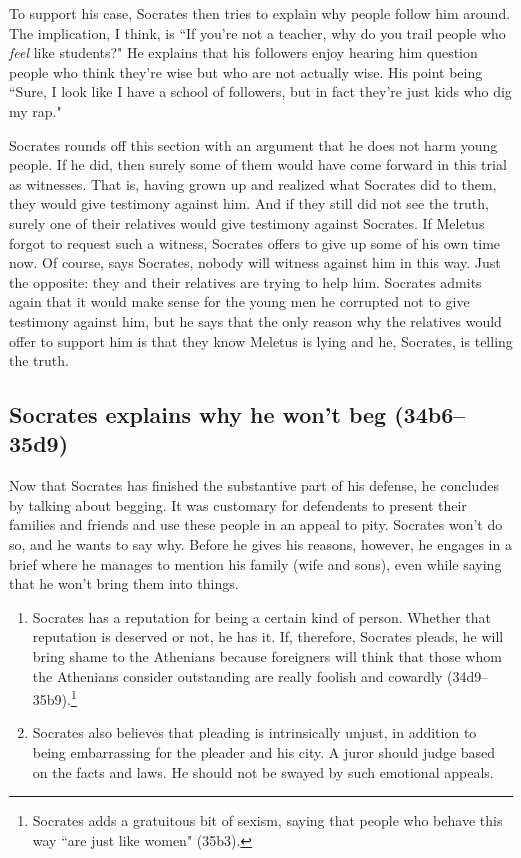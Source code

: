 \documentclass[11pt]{article}
\begin{document}
To support his case, Socrates then tries to explain why people follow him
around.  The implication, I think, is ``If you're not a teacher, why do you
trail people who \emph{feel} like students?"  He explains that his followers
enjoy hearing him question people who think they're wise but who are not
actually wise.  His point being ``Sure, I look like I have a school of
followers, but in fact they're just kids who dig my rap."

Socrates rounds off this section with an argument that he does not harm young
people.  If he did, then surely some of them would have come forward in this
trial as witnesses.  That is, having grown up and realized what Socrates did to
them, they would give testimony against him.  And if they still did not see the
truth, surely one of their relatives would give testimony against Socrates.  If
Meletus forgot to request such a witness, Socrates offers to give up some of
his own time now.  Of course, says Socrates, nobody will witness against him in
this way.  Just the opposite: they and their relatives are trying to help him.
Socrates admits again that it would make sense for the young men he corrupted
not to give testimony against him, but he says that the only reason why the
relatives would offer to support him is that they know Meletus is lying and he,
Socrates, is telling the truth.


\subsection{Socrates explains why he won't beg (34b6--35d9)}

Now that Socrates has finished the substantive part of his defense, he
concludes by talking about begging.  It was customary for defendents to present
their families and friends and use these people in an appeal to pity.  Socrates
won't do so, and he wants to say why.  Before he gives his reasons, however, he
engages in a brief  where he manages to mention his family
(wife and sons), even while saying that he won't bring them into things.

\begin{enumerate}
    \item Socrates has a reputation for being a certain kind of person.
        Whether that reputation is deserved or not, he has it. If, therefore,
        Socrates pleads, he will bring shame to the Athenians because
        foreigners will think that those whom the Athenians consider
        outstanding are really foolish and cowardly
        (34d9--35b9).\footnote{Socrates adds a gratuitous bit of sexism, saying
        that people who behave this way ``are just like women" (35b3).}
    \item Socrates also believes that pleading is intrinsically unjust, in
        addition to being embarrassing for the pleader and his city.  A juror
        should judge based on the facts and laws.  He should not be swayed by
        such emotional appeals.
\end{enumerate}
\end{document}

